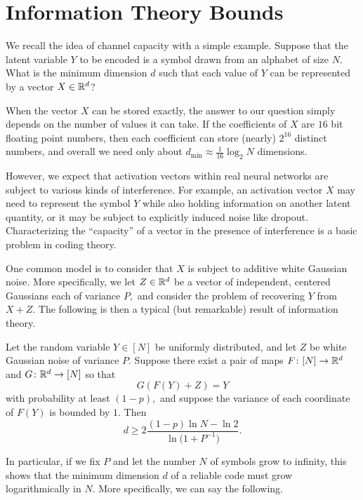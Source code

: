 \section{Information Theory Bounds \label{sec:information}}

We recall the idea of channel capacity with a simple example. Suppose that the latent variable $Y$ to be encoded is a symbol drawn from an alphabet of size $N.$ What is the minimum dimension $d$ such that each value of $Y$ can be represented by a vector $X \in \mathbb{R}^d$?

When the vector $X$ can be stored exactly, the answer to our question simply depends on the number of values it can take. If the coefficients of $X$ are $16$ bit floating point numbers, then each coefficient can store (nearly) $2^{16}$ distinct numbers, and overall we need only about $d_\text{min} \approx \frac 1 {16} \log_2 N$ dimensions.

However, we expect that activation vectors within real neural networks are subject to various kinds of interference. For example, an activation vector $X$ may need to represent the symbol $Y$ while also holding information on another latent quantity, or it may be subject to explicitly induced noise like dropout. Characterizing the ``capacity'' of a vector in the presence of interference is a basic problem in coding theory.

One common model is to consider that $X$ is subject to additive white Gaussian noise. More specifically, we let $Z \in \mathbb{R}^d$ be a vector of independent, centered Gaussians each of variance $P,$ and consider the problem of recovering $Y$ from $X + Z.$ The following is then a typical (but remarkable) result of information theory.

\begin{proposition} \label{prop:information}
    Let the random variable $Y \in [N]$ be uniformly distributed, and let $Z$ be white Gaussian noise of variance $P.$ Suppose there exist a pair of maps $F \colon [N] \to \mathbb{R}^d$ and $G \colon \mathbb{R}^d \to [N]$ so that
	$$
		G(F(Y) + Z) = Y
	$$
	with probability at least $(1 - p),$ and suppose the variance of each coordinate of $F(Y)$ is bounded by $1.$ Then
	$$
	d \geq 2 \frac{(1 - p) \ln N - \ln 2}{\ln \bigl( 1 + P^{-1} \bigr)}.
	$$
\end{proposition}

In particular, if we fix $P$ and let the number $N$ of symbols grow to infinity, this shows that the minimum dimension $d$ of a reliable code must grow logarithmically in $N.$ More specifically, we can say the following.

